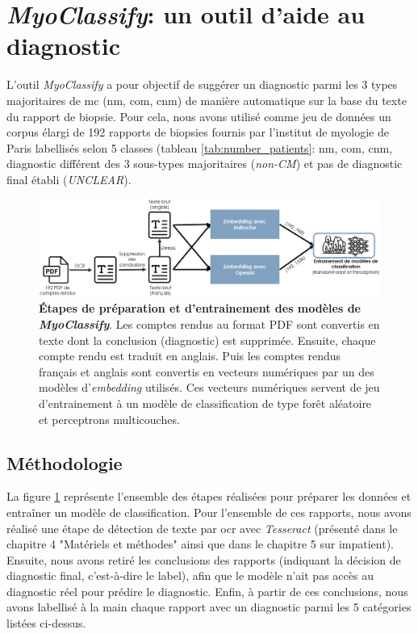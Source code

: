 \section{\textit{MyoClassify}: un outil d'aide au diagnostic}
L'outil \textit{MyoClassify} a pour objectif de suggérer un diagnostic parmi les 3 types majoritaires de \gls{mc} (\gls{nm}, \gls{com}, \gls{cnm}) de manière automatique sur la base du texte du rapport de biopsie. Pour cela, nous avons utilisé comme jeu de données un corpus élargi de 192 rapports de biopsies fournis par l'institut de myologie de Paris labellisés selon 5 classes (tableau \ref{tab:number_patients}: \gls{nm}, \gls{com}, \gls{cnm}, diagnostic différent des 3 sous-types majoritaires (\textit{non-CM}) et pas de diagnostic final établi (\textit{UNCLEAR}).
\begin{figure}[!ht]
 \centering
 \includegraphics[width=1\textwidth]{figures/myoclassify_flow.png}
 \caption[Entrainement modèle \textit{MyoClassify}]{\textbf{Étapes de préparation et d'entrainement des modèles de \textit{MyoClassify}}. Les comptes rendus au format PDF sont convertis en texte dont la conclusion (diagnostic) est supprimée. Ensuite, chaque compte rendu est traduit en anglais. Puis les comptes rendus français et anglais sont convertis en vecteurs numériques par un des modèles d'\textit{embedding} utilisés. Ces vecteurs numériques servent de jeu d'entrainement à un modèle de classification de type forêt aléatoire et perceptrons multicouches.}
 \label{fig:myoclassify_flow}
\end{figure}
\subsection{Méthodologie}
La figure \ref{fig:myoclassify_flow} représente l'ensemble des étapes réalisées pour préparer les données et entraîner un modèle de classification. Pour l'ensemble de ces rapports, nous avons réalisé une étape de détection de texte par \gls{ocr} avec \textit{Tesseract} (présenté dans le chapitre 4 "Matériels et méthodes" ainsi que dans le chapitre 5 sur \gls{impatient}). Ensuite, nous avons retiré les conclusions des rapports (indiquant la décision de diagnostic final, c'est-à-dire le label), afin que le modèle n'ait pas accès au diagnostic réel pour prédire le diagnostic. Enfin, à partir de ces conclusions, nous avons labellisé à la main chaque rapport avec un diagnostic parmi les 5 catégories listées ci-dessus.

